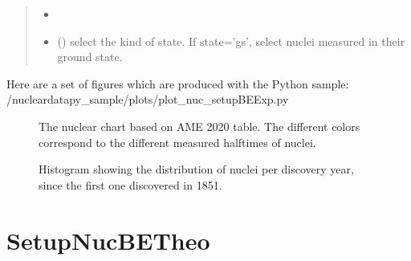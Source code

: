 \documentclass[letterpaper,10pt,english]{sphinxmanual}
\begin{document}
\begin{fulllineitems}
\begin{fulllineitems}
\begin{quote}
\begin{description}
\begin{itemize}
\item {} 
\sphinxAtStartPar
{} \textendash{} 

\item {} 
\sphinxAtStartPar
{} (\sphinxstyleliteralemphasis{\sphinxupquote{, }}) \textendash{} select the kind of state. If state=’gs’, select nuclei measured in their ground state.

\end{itemize}

\end{description}\end{quote}

\sphinxAtStartPar
{}

\end{fulllineitems}


\end{fulllineitems}


\sphinxAtStartPar
Here are a set of figures which are produced with the Python sample: /nucleardatapy\_sample/plots/plot\_nuc\_setupBEExp.py

\begin{figure}[htbp]
\centering
\capstart

\noindent{}
\caption{The nuclear chart based on AME 2020 table. The different colors correspond to the different measured half\sphinxhyphen{}times of nuclei.}\label{\detokenize{source/api/setup_nuc_be_exp:id1}}\end{figure}

\begin{figure}[htbp]
\centering
\capstart

\noindent{}
\caption{Histogram showing the distribution of nuclei per discovery year, since the first one discovered in 1851.}\label{\detokenize{source/api/setup_nuc_be_exp:id2}}\end{figure}

\sphinxstepscope


\section{SetupNucBETheo}
\label{\detokenize{source/api/setup_nuc_be_theo:setupnucbetheo}}\label{\detokenize{source/api/setup_nuc_be_theo::doc}}\label{\detokenize{source/api/setup_nuc_be_theo:module-nucleardatapy.nuc.setup_be_theo}}
\end{document}
